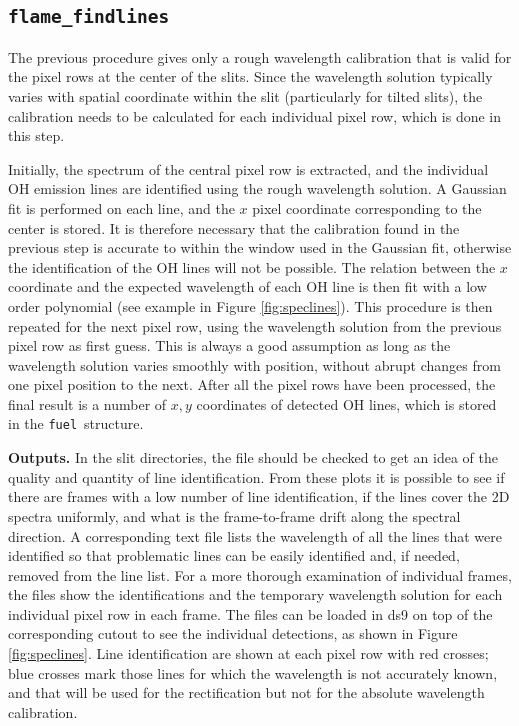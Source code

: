 \documentclass[a4paper]{article}
\newcommand{\fuel}{\texttt{fuel}}
\begin{document}
\begin{sloppypar}
\subsection{\texttt{flame\_findlines}}


The previous procedure gives only a rough wavelength calibration that is valid for the pixel rows at the center of the slits. Since the wavelength solution typically varies with spatial coordinate within the slit (particularly for tilted slits), the calibration needs to be calculated for each individual pixel row, which is done in this step.

Initially, the spectrum of the central pixel row is extracted, and the individual OH emission lines are identified using the rough wavelength solution. A Gaussian fit is performed on each line, and the $x$ pixel coordinate corresponding to the center is stored. It is therefore necessary that the calibration found in the previous step is accurate to within the window used in the Gaussian fit, otherwise the identification of the OH lines will not be possible. The relation between the $x$ coordinate and the expected wavelength of each OH line is then fit with a low order polynomial (see example in Figure \ref{fig:speclines}). This procedure is then repeated for the next pixel row, using the wavelength solution from the previous pixel row as first guess. This is always a good assumption as long as the wavelength solution varies smoothly with position, without abrupt changes from one pixel position to the next. After all the pixel rows have been processed, the final result is a number of $x,y$ coordinates of detected OH lines, which is stored in the \fuel\ structure.

\medskip
\noindent
\textbf{Outputs.} In the slit directories, the file  should be checked to get an idea of the quality and quantity of line identification. From these plots it is possible to see if there are frames with a low number of line identification, if the lines cover the 2D spectra uniformly, and what is the frame-to-frame drift along the spectral direction. A corresponding text file lists the wavelength of all the lines that were identified so that problematic lines can be easily identified and, if needed, removed from the line list. For a more thorough examination of individual frames, the  files show the identifications and the temporary wavelength solution for each individual pixel row in each frame. The  files can be loaded in ds9 on top of the corresponding cutout to see the individual detections, as shown in Figure \ref{fig:speclines}. Line identification are shown at each pixel row with red crosses; blue crosses mark those lines for which the wavelength is not accurately known, and that will be used for the rectification but not for the absolute wavelength calibration.


\end{sloppypar}
\end{document}
